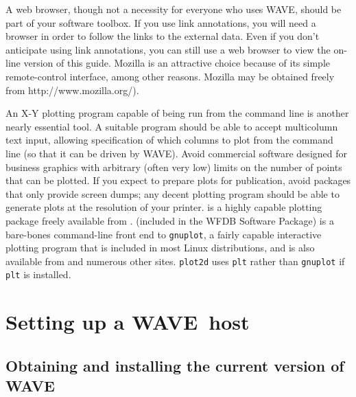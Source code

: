 \documentclass[twoside]{book}
\newcommand{\WAVE}{{\sf WAVE}\xspace}
\begin{document}
A web browser, though not a necessity for everyone who uses \WAVE{},
should be part of your software toolbox.  If you use link annotations,
you will need a browser in order to follow the links to the external
data.  Even if you don't anticipate using link annotations, you can
still use a web browser to view the on-line version of this guide.
Mozilla is an attractive choice because of its simple remote-control
interface, among other reasons.  Mozilla may be obtained freely from
{http://www.mozilla.org/}).

An X-Y plotting program capable of being run from the command line is another
nearly essential tool.  A suitable program should be able to accept multicolumn
text input, allowing specification of which columns to plot from the
command line (so that it can be driven by \WAVE{}).  Avoid commercial software
designed for business graphics with arbitrary (often very low) limits
on the number of points that can be plotted.  If you expect to prepare
plots for publication, avoid packages that only provide screen dumps;
any decent plotting program should be able to generate plots
at the resolution of your printer.  
 is a highly capable
plotting package freely available from
.
(included in the WFDB Software Package) is a
bare-bones command-line front end to {\tt gnuplot}, a fairly capable
interactive plotting program that is included in most Linux distributions,
and is also available from
 and
numerous other sites.
{\tt plot2d} uses {\tt plt} rather than {\tt gnuplot} if {\tt plt} is
installed.

\chapter{Setting up a \WAVE{}~host}

\label{app:setup}
\section{Obtaining and installing the current version of \WAVE{}}
\end{document}
